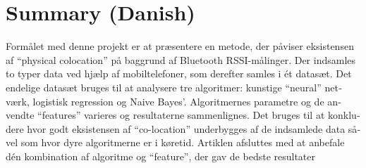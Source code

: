 \chapter{Summary (Danish)}
\begin{otherlanguage}{danish}

Formålet med denne projekt er at præsentere en metode, der påviser eksistensen af “physical colocation” på baggrund af Bluetooth RSSI-målinger. Der indsamles to typer data ved hjælp af mobiltelefoner, som derefter samles i ét datasæt. Det endelige datasæt bruges til at analysere tre algoritmer: kunstige “neural” netværk, logistisk regression og Naive Bayes’. Algoritmernes parametre og de anvendte “features”  varieres og resultaterne sammenlignes. Det bruges til at konkludere hvor godt eksistensen af “co-location” underbygges af de indsamlede data såvel som hvor dyre algoritmerne er i køretid. Artiklen afsluttes med at anbefale dén kombination af algoritme og “feature”, der gav de bedste resultater

\end{otherlanguage}